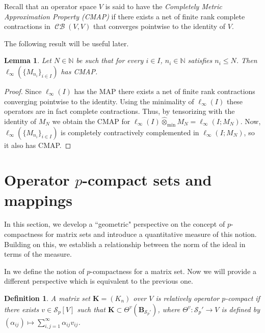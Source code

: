 \documentclass[11pt]{amsart}
\DeclareMathOperator{\CB}{\mathcal{CB}}
\newcommand{\N}{{\mathbb{N}}}
\newtheorem{lemma}[theorem]{Lemma}
\newtheorem{definition}[theorem]{Definition}
\numberwithin{equation}{section}
\begin{document}
Recall that an operator space $V$ is said to have the \emph{Completely Metric Approximation Property (CMAP)} if there exists a net of finite rank complete contractions in $\CB(V,V)$ that converges pointwise to the identity of $V$.

The following result will be useful later.

\begin{lemma}\label{lemma-ell_infty-has-CMAP}
Let $N\in \N$ be such that for every $i\in I$, $n_i \in \N$ satisfies $n_i \le N$. 
Then $\ell_\infty(\{M_{n_i}\}_{i \in I})$ has CMAP.
\end{lemma}

\begin{proof}
Since $\ell_\infty(I)$ has the MAP there exists a net of finite rank contractions converging pointwise to the identity. Using the minimality of $\ell_\infty(I)$ these operators are in fact complete contractions. Thus, by tensorizing with the identity of $M_N$ we obtain the CMAP for $\ell_\infty(I) \widehat\otimes_{\min} M_N = \ell_\infty(I; M_N)$.
Now, $\ell_\infty(\{M_{n_i}\}_{i \in I})$ is completely contractively complemented in $\ell_\infty(I; M_N)$, so it also has CMAP.
\end{proof}


\section{Operator $p$-compact sets and mappings}\label{sec-sets-and-mappings}

In this section, we develop a ``geometric" perspective on the concept of $p$-compactness for matrix sets and introduce a quantitative measure of this notion. Building on this, we establish a relationship between the norm of the ideal in terms of the measure.

In \cite[Def. 3.9]{ChaDiGa-Operator-p-compact} we define the notion of $p$-compactness for a matrix set. Now we will provide a different perspective which is equivalent to the previous one.

\begin{definition}\label{defn-operator-p-compact}
   A matrix set $\mathbf{K}=(K_n)$ over $V$ is \emph{relatively operator $p$-compact} if there exists $v \in \mathcal{S}_p[V]$ such that $\mathbf{K}\subset \Theta^v(\mathbf{B}_{\mathcal{S}_p'})$, where $\Theta^v: \mathcal{S}_p' \to V$ is defined by $(\alpha_{ij}) \mapsto \sum_{i,j=1}^{\infty} \alpha_{ij} v_{ij}$. 
   \end{definition}
\end{document}
